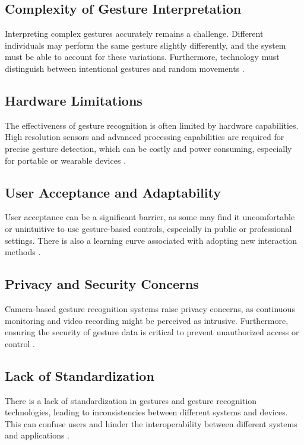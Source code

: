 \subsection{Complexity of Gesture Interpretation}
Interpreting complex gestures accurately remains a challenge. Different individuals may perform the same gesture slightly differently, and the system must be able to account for these variations. Furthermore, technology must distinguish between intentional gestures and random movements \cite{Escalera2016}.

\subsection{Hardware Limitations}
The effectiveness of gesture recognition is often limited by hardware capabilities. High resolution sensors and advanced processing capabilities are required for precise gesture detection, which can be costly and power consuming, especially for portable or wearable devices \cite{Iyer2016}.

\subsection{User Acceptance and Adaptability}
User acceptance can be a significant barrier, as some may find it uncomfortable or unintuitive to use gesture-based controls, especially in public or professional settings. There is also a learning curve associated with adopting new interaction methods \cite{Si2022}.

\subsection{Privacy and Security Concerns}
Camera-based gesture recognition systems raise privacy concerns, as continuous monitoring and video recording might be perceived as intrusive. Furthermore, ensuring the security of gesture data is critical to prevent unauthorized access or control \cite{Wu2023}.

\subsection{Lack of Standardization}
There is a lack of standardization in gestures and gesture recognition technologies, leading to inconsistencies between different systems and devices. This can confuse users and hinder the interoperability between different systems and applications \cite{Li2022}.

